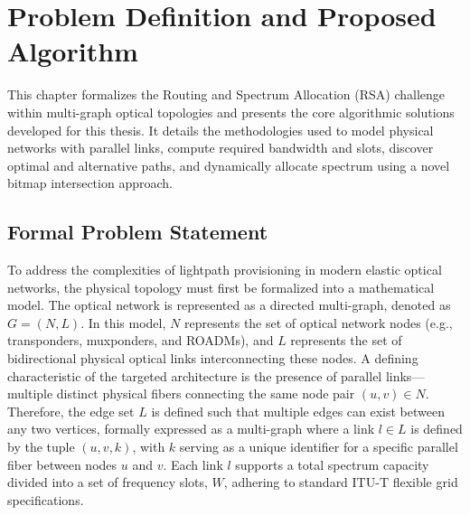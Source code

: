 \chapter{Problem Definition and Proposed Algorithm}
This chapter formalizes the Routing and Spectrum Allocation (RSA) challenge within multi-graph optical topologies and presents the core algorithmic solutions developed for this thesis. It details the methodologies used to model physical networks with parallel links, compute required bandwidth and slots, discover optimal and alternative paths, and dynamically allocate spectrum using a novel bitmap intersection approach.
\section{Formal Problem Statement}
To address the complexities of lightpath provisioning in modern elastic optical networks, the physical topology must first be formalized into a mathematical model. The optical network is represented as a directed multi-graph, denoted as $G=(N,L)$. In this model, $N$ represents the set of optical network nodes (e.g., transponders, muxponders, and ROADMs), and $L$ represents the set of bidirectional physical optical links interconnecting these nodes. A defining characteristic of the targeted architecture is the presence of parallel links—multiple distinct physical fibers connecting the same node pair $(u,v)\in N$. Therefore, the edge set $L$ is defined such that multiple edges can exist between any two vertices, formally expressed as a multi-graph where a link $l\in L$ is defined by the tuple $(u,v,k)$, with $k$ serving as a unique identifier for a specific parallel fiber between nodes $u$ and $v$. Each link $l$ supports a total spectrum capacity divided into a set of frequency slots, $W$, adhering to standard ITU-T flexible grid specifications.

